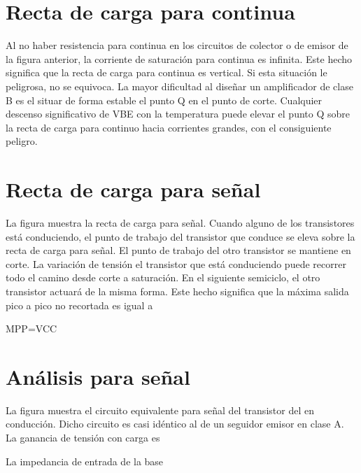\documentclass[10pt,letterpaper]{article}
\begin{document}
\section{Recta de carga para continua}
Al no haber resistencia para continua en los circuitos de colector o de emisor de la figura anterior, la corriente de saturación para continua es infinita. Este hecho significa que la recta de carga para continua es vertical. Si esta situación le peligrosa, no se equivoca. La mayor dificultad al diseñar un amplificador de clase B es el situar de forma estable el punto Q en el punto de corte. Cualquier descenso significativo de VBE con la temperatura puede elevar el punto Q sobre la recta de carga para continuo hacia corrientes grandes, con el consiguiente peligro.
\section{Recta de carga para señal}
La figura muestra la recta de carga para señal. Cuando alguno de los transistores está conduciendo, el punto de trabajo del transistor que conduce se eleva sobre la recta de carga para señal. El punto de trabajo del otro transistor se mantiene en corte. La variación de tensión el transistor que está conduciendo puede recorrer todo el camino desde corte a saturación. En el siguiente semiciclo, el otro transistor actuará de la misma forma. Este hecho significa que la máxima salida pico a pico no recortada es igual a

MPP=VCC

\section{Análisis para señal}
La figura muestra el circuito equivalente para señal del transistor del en conducción. Dicho circuito es casi idéntico al de un seguidor emisor en clase A. La ganancia de tensión con carga es

La impedancia de entrada de la base
\end{document}
